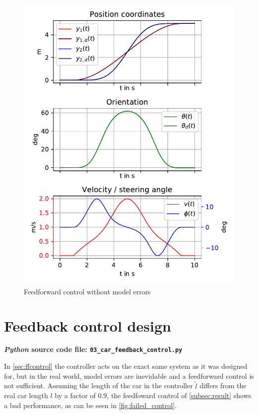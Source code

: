 \documentclass[a4paper,11pt,headings=standardclasses,parskip=half]{scrartcl}
\newcommand{\py}{\emph{Python}\xspace}
\begin{document}
\begin{figure}[ht]
\centering
\includegraphics[scale=1]{img/control_trajectory.pdf}
\caption{Feedforward control without model errors}
\label{fig:control_trajectory}
\end{figure}
\clearpage
\section{Feedback control design}
\label{sec:fbcontrol}
\textbf{\py source code file: \texttt{03\_car\_feedback\_control.py}}

In \autoref{sec:ffcontrol} the controller acts on the exact same system as it was designed for, but in the real world, model errors are inevidable and a feedforward control is not sufficient. Assuming the length of the car in the controller $\tilde{l}$ differs from the real car length $l$ by a factor of $0.9$, the feedfoward control of \ref{subsec:result} shows a bad performance, as can be seen in \autoref{fig:failed_control}. 
\end{document}

